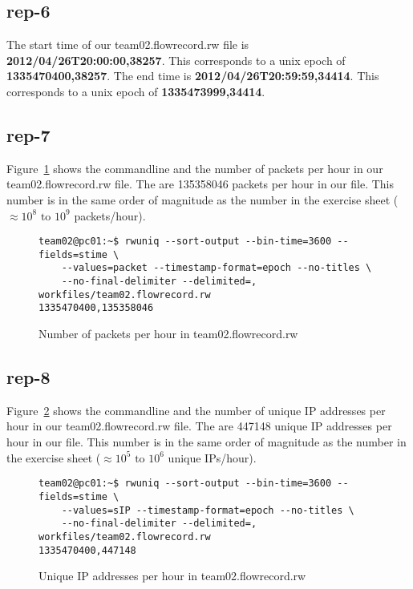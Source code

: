 \documentclass{article}
\begin{document}
\subsection{rep-6}

The start time of our team02.flowrecord.rw file is \textbf{2012/04/26T20:00:00,38257}. This corresponds to
a unix epoch of \textbf{1335470400,38257}. The end time is \textbf{2012/04/26T20:59:59,34414}. This corresponds
to a unix epoch of \textbf{1335473999,34414}.

\subsection{rep-7}

Figure~\ref{figure:packets_per_hour} shows the commandline and the number of packets per hour in our
team02.flowrecord.rw file.
The are 135358046 packets per hour in our file. This number is in the
same order of magnitude as the number in the exercise sheet ($\approx 10^8 \text{ to } 10^9$ packets/hour).

\begin{figure}[h]
\begin{verbatim}
team02@pc01:~$ rwuniq --sort-output --bin-time=3600 --fields=stime \
    --values=packet --timestamp-format=epoch --no-titles \
    --no-final-delimiter --delimited=, workfiles/team02.flowrecord.rw
1335470400,135358046
\end{verbatim}
\caption{\label{figure:packets_per_hour} Number of packets per hour in team02.flowrecord.rw}
\end{figure}

\subsection{rep-8}

Figure~\ref{figure:unique_ip_per_hour} shows the commandline and the number of unique IP addresses per hour in
our team02.flowrecord.rw file.
The are 447148 unique IP addresses per hour in our file. This number is in the
same order of magnitude as the number in the exercise sheet ($\approx 10^5 \text{ to } 10^6$ unique IPs/hour).

\begin{figure}[h]
\begin{verbatim}
team02@pc01:~$ rwuniq --sort-output --bin-time=3600 --fields=stime \
    --values=sIP --timestamp-format=epoch --no-titles \
    --no-final-delimiter --delimited=, workfiles/team02.flowrecord.rw
1335470400,447148
\end{verbatim}
\caption{\label{figure:unique_ip_per_hour} Unique IP addresses per hour in team02.flowrecord.rw}
\end{figure}
\end{document}
